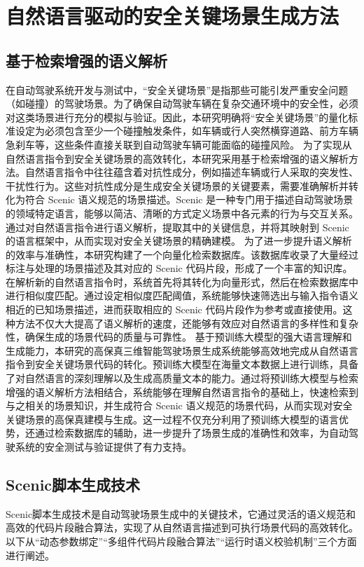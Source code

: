 \chapter{自然语言驱动的安全关键场景生成方法}
\section{基于检索增强的语义解析}
在自动驾驶系统开发与测试中，“安全关键场景”是指那些可能引发严重安全问题（如碰撞）的驾驶场景。为了确保自动驾驶车辆在复杂交通环境中的安全性，必须对这类场景进行充分的模拟与验证。因此，本研究明确将“安全关键场景”的量化标准设定为必须包含至少一个碰撞触发条件，如车辆或行人突然横穿道路、前方车辆急刹车等，这些条件直接关联到自动驾驶车辆可能面临的碰撞风险。
为了实现从自然语言指令到安全关键场景的高效转化，本研究采用基于检索增强的语义解析方法。自然语言指令中往往蕴含着对抗性成分，例如描述车辆或行人采取的突发性、干扰性行为。这些对抗性成分是生成安全关键场景的关键要素，需要准确解析并转化为符合 Scenic 语义规范的场景描述。Scenic 是一种专门用于描述自动驾驶场景的领域特定语言，能够以简洁、清晰的方式定义场景中各元素的行为与交互关系。通过对自然语言指令进行语义解析，提取其中的关键信息，并将其映射到 Scenic 的语言框架中，从而实现对安全关键场景的精确建模。
为了进一步提升语义解析的效率与准确性，本研究构建了一个向量化检索数据库。该数据库收录了大量经过标注与处理的场景描述及其对应的 Scenic 代码片段，形成了一个丰富的知识库。在解析新的自然语言指令时，系统首先将其转化为向量形式，然后在检索数据库中进行相似度匹配。通过设定相似度匹配阈值，系统能够快速筛选出与输入指令语义相近的已知场景描述，进而获取相应的 Scenic 代码片段作为参考或直接使用。这种方法不仅大大提高了语义解析的速度，还能够有效应对自然语言的多样性和复杂性，确保生成的场景代码的质量与可靠性。
基于预训练大模型的强大语言理解和生成能力，本研究的高保真三维智能驾驶场景生成系统能够高效地完成从自然语言指令到安全关键场景代码的转化。预训练大模型在海量文本数据上进行训练，具备了对自然语言的深刻理解以及生成高质量文本的能力。通过将预训练大模型与检索增强的语义解析方法相结合，系统能够在理解自然语言指令的基础上，快速检索到与之相关的场景知识，并生成符合 Scenic 语义规范的场景代码，从而实现对安全关键场景的高保真建模与生成。这一过程不仅充分利用了预训练大模型的语言优势，还通过检索数据库的辅助，进一步提升了场景生成的准确性和效率，为自动驾驶系统的安全测试与验证提供了有力支持。


\section{Scenic脚本生成技术}
Scenic脚本生成技术是自动驾驶场景生成中的关键技术，它通过灵活的语义规范和高效的代码片段融合算法，实现了从自然语言描述到可执行场景代码的高效转化。以下从“动态参数绑定”“多组件代码片段融合算法”“运行时语义校验机制”三个方面进行阐述。
